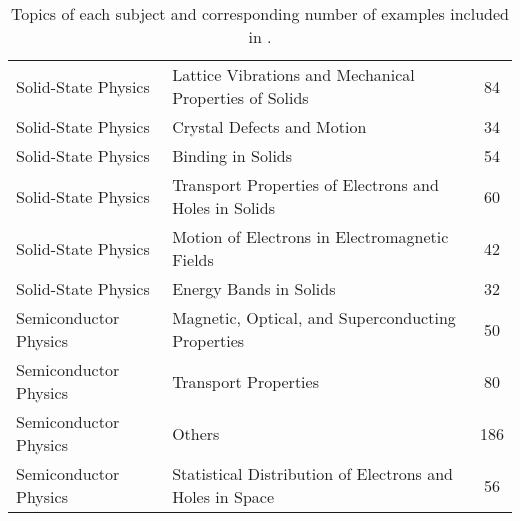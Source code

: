 \begin{table}[hbp]
{\begin{tabular}[tbp]{lp{8cm}c}
Solid-State Physics & Lattice Vibrations and Mechanical Properties of Solids & 84 \\ 
Solid-State Physics & Crystal Defects and Motion & 34 \\ 
Solid-State Physics & Binding in Solids & 54 \\ 
Solid-State Physics & Transport Properties of Electrons and Holes in Solids & 60 \\ 
Solid-State Physics & Motion of Electrons in Electromagnetic Fields & 42 \\ 
Solid-State Physics & Energy Bands in Solids & 32 \\ 
\hline
Semiconductor Physics & Magnetic, Optical, and Superconducting Properties & 50 \\ 
Semiconductor Physics & Transport Properties & 80 \\ 
Semiconductor Physics & Others & 186 \\ 
Semiconductor Physics & Statistical Distribution of Electrons and Holes in Space & 56 \\ 
\bottomrule
\end{tabular}}
\caption{Topics of each subject and corresponding number of examples included in {\benchmark}.}
\label{tabapp:topics}
\end{table}




